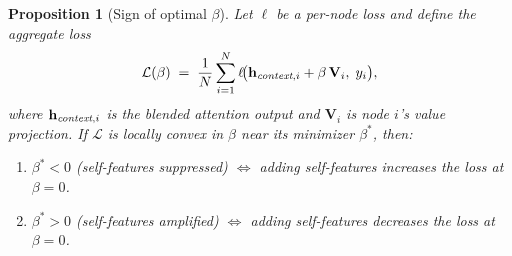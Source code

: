\documentclass[sigconf]{acmart}
\newtheorem{proposition}{Proposition}
\begin{document}
\begin{proposition}[Sign of optimal $\beta$]
\label{prop:beta}
Let $\ell$ be a per-node loss and define the aggregate loss
\[
\mathcal{L}(\beta) \;=\; \frac{1}{N} \sum_{i=1}^{N} \ell\!\bigl(\mathbf{h}_{\emph{context},i} + \beta \, \mathbf{V}_i,\; y_i\bigr),
\]
where $\mathbf{h}_{\emph{context},i}$ is the blended attention output and $\mathbf{V}_i$ is node $i$'s value projection. If $\mathcal{L}$ is locally convex in $\beta$ near its minimizer $\beta^*$, then:
\begin{enumerate}
    \item $\beta^* < 0$ \;\;(self-features suppressed) \;$\iff$\; adding self-features increases the loss at $\beta = 0$.
    \item $\beta^* > 0$ \;\;(self-features amplified) \;$\iff$\; adding self-features decreases the loss at $\beta = 0$.
\end{enumerate}
\end{proposition}
\end{document}
